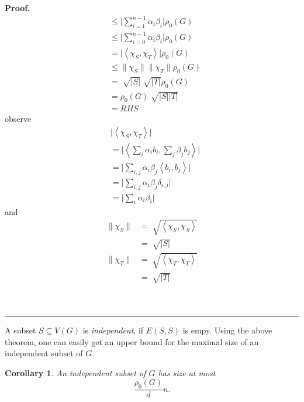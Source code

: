\documentclass[12pt]{article}%
\newtheorem{corollary}[theorem]{Corollary}
\newenvironment{proof}[1][Proof]{\textbf{#1.} }{\ \rule{0.5em}{0.5em}}
\begin{document}
\begin{proof}
\begin{align}
        &\leq \lvert \sum_{i=1}^{n-1} \alpha_i \beta_i \rvert \rho_0 (G)\\
        &\leq \lvert \sum_{i=0}^{n-1} \alpha_i \beta_i \rvert \rho_0 (G)\\
        &= \lvert \left\langle \chi_S, \chi_T \right\rangle\rvert \rho_0 (G)\\
        &\leq \lVert \chi_S \rVert \lVert \chi_T \rVert \rho_0 (G)\\
        &= \sqrt[]{\lvert S \rvert} \sqrt[]{\lvert T \rvert} \rho_0 (G)\\
        &= \rho_0 (G) \sqrt[]{\lvert S \rvert \lvert T \rvert}\\
        &= RHS
    \end{align}
    observe 
    \begin{align}
        &\lvert \left\langle \chi_S, \chi_T \right\rangle\rvert\\
        &= \lvert \left\langle \sum_i \alpha_i b_i, \sum_j \beta_j b_j \right\rangle\rvert\\
        &= \lvert \sum_{i,j} \alpha_i \beta_j \left\langle b_i, b_j \right\rangle\rvert\\
        &= \lvert \sum_{i,j} \alpha_i \beta_j \delta_{i,j} \rvert\\
        &= \lvert \sum_i \alpha_i \beta_i \rvert
    \end{align}
    and 
    \begin{align}
        \lVert \chi_S \rVert &= \sqrt[]{\left\langle \chi_S, \chi_S \right\rangle}\\
        &= \sqrt[]{\lvert S \rvert}\\
        \lVert \chi_T \rVert &= \sqrt[]{\left\langle \chi_T, \chi_T \right\rangle}\\
        &= \sqrt[]{\lvert T \rvert}\\
    \end{align}
    
    
    
    
\end{proof}


A subset $S\subseteq V(G)$ is \emph{independent}, if $E(S,S)$ is empy. Using
the above theorem, one can easily get an upper bound for the maximal size of
an independent subset of $G$.


\begin{corollary}
An independent subset of $G$ has size at most
\[
\frac{\rho_{0}(G)}{d}n\text{.}%
\]

\end{corollary}
\end{document}

